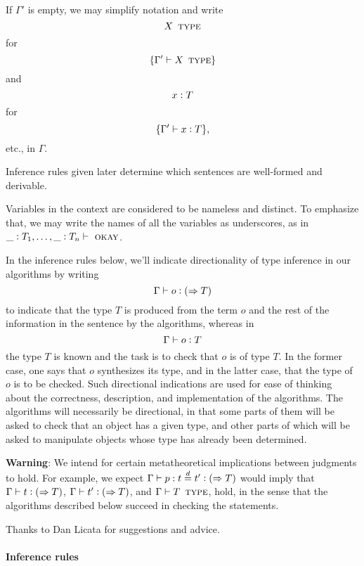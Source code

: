 \documentclass[11pt]{article}
\newcommand{\eqd}{\stackrel{d}{=}}
\newcommand{\ccolon}[1]{\vcentcolon#1}
\newcommand{\synth}[1]{\vcentcolon(\Rightarrow#1)} %
\newcommand{\ccheck}[1]{\vcentcolon#1}  %
\newcommand{\Type}{\mathop{\text{ \sc type}}}
\newcommand{\Okay}{\mathop{\text{ \sc okay}}}
\newcommand{\var}{\char`_}
\begin{document}
If $\Gamma'$ is empty, we may simplify notation and write
$$ X \Type $$
for
$$\{ \Gamma'\vdash X \Type \}$$
and
$$x \ccolon{T}$$
for
$$\{ \Gamma'\vdash x \ccolon{T} \},$$
etc., in $\Gamma$.

Inference rules given later determine which sentences are well-formed and
derivable.

Variables in the context are considered to be nameless and distinct.  To
emphasize that, we may write the names of all the variables as underscores, as
in $\var \ccolon{T_1},\dots,\var \ccolon{T_n}\vdash \Okay$.

In the inference rules below, we'll indicate directionality of type inference
in our algorithms by writing 
$$\Gamma\vdash o \synth{T}$$ to indicate that the type $T$ is produced
from the term $o$ and the rest of the information in the sentence by the
algorithms, whereas in $$\Gamma\vdash o \ccheck{T}$$ the type $T$ is known and
the task is to check that $o$ is of type $T$.  In the former case, one says
that $o$ synthesizes its type, and in the latter case, that the type of $o$ is
to be checked.  Such directional indications are used for ease of thinking
about the correctness, description, and implementation of the algorithms.  The
algorithms will necessarily be directional, in that some parts of them will be
asked to check that an object has a given type, and other parts of which will
be asked to manipulate objects whose type has already been determined.

{\bf Warning}: We intend for certain metatheoretical implications between
judgments to hold.  For example, we expect $\Gamma \vdash p : t \eqd t'
\synth{T}$ would imply that $\Gamma \vdash t \synth{T}$, $\Gamma \vdash t'
\synth{T}$, and $\Gamma \vdash T \Type$, hold, in the sense that the algorithms
described below succeed in checking the statements.

Thanks to Dan Licata for suggestions and advice.

\paragraph{Inference rules} 
\end{document}
